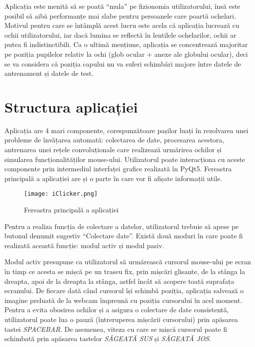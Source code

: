 Aplicația este menită să se poată ``mula'' pe fizionomia utilizatorului, însă este posibil să aibă performanțe mai slabe pentru persoanele care poartă ochelari.
Motivul pentru care se întâmplă acest lucru este acela că aplicația lucrează cu ochii utilizatorului, iar dacă lumina se reflectă în lentilele ochelarilor, ochii ar putea fi indistinctibili.
Ca o ultimă mențiune, aplicația se concentrează majoritar pe poziția pupilelor relativ la ochi (glob ocular + anexe ale globului ocular), deci se va considera că poziția capului nu va suferi schimbări majore între datele de antrenament și datele de test.

\section{Structura aplicației}
Aplicația are 4 mari componente, corespunzătoare pașilor luați în rezolvarea unei probleme de învățarea automată: colectarea de date, procesarea acestora, antrenarea unei rețele convoluționale care realizează urmărirea ochilor și simularea funcționalităților mouse-ului.
Utilizatorul poate interacționa cu aceste componente prin intermediul interfaței grafice realizată în PyQt5.
Fereastra principală a aplicației are și o parte în care vor fi afișate informații utile.

\begin{figure}[ht]
    \centering
    \texttt{[image: iClicker.png]}
    \caption{Fereastra principală a aplicației}
\end{figure}

Pentru a realiza funcția de colectare a datelor, utilizatorul trebuie să apese pe butonul denumit sugestiv ``Colectare date''.
Există două moduri în care poate fi realizată această funcție: modul activ și modul pasiv.

Modul activ presupune ca utilizatorul să urmărească cursorul mouse-ului pe ecran în timp ce acesta se mișcă pe un traseu fix, prin mișcări glisante, de la stânga la dreapta, apoi de la dreapta la stânga, astfel încât să acopere toată suprafața ecranului.
De fiecare dată când cursorul își schimbă poziția, aplicația salvează o imagine preluată de la webcam împreună cu poziția cursorului în acel moment.
Pentru a evita obosirea ochilor și a asigura o colectare de date consistentă, utilizatorul poate lua o pauză (întreruperea mișcării cursorului) prin apăsarea tastei \emph{SPACEBAR}.
De asemenea, viteza cu care se mișcă cursorul poate fi schimbată prin apăsarea tastelor \emph{SĂGEATĂ SUS} și \emph{SĂGEATĂ JOS}.


